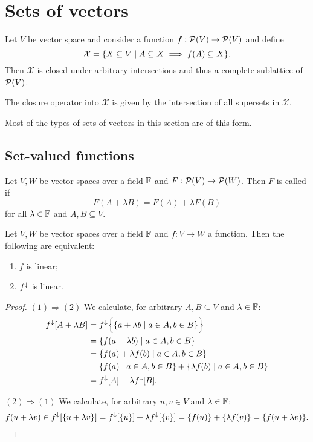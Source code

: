 \section{Sets of vectors}
\begin{proposition} \label{latticesOfVectorSubsets}
Let $V$ be vector space and consider a function $f: \operatorname{\mathcal{P}}(V) \to \operatorname{\mathcal{P}}(V)$ and define
\[ \mathcal{X} = \setbuilder{X\subseteq V}{A \subseteq X \implies f(A)\subseteq X}. \]
Then $\mathcal{X}$ is closed under arbitrary intersections and thus a complete sublattice of $\operatorname{\mathcal{P}}(V)$.

The closure operator into $\mathcal{X}$ is given by the intersection of all supersets in $\mathcal{X}$.
\end{proposition}

Most of the types of sets of vectors in this section are of this form.



\subsection{Set-valued functions}
\begin{definition}
Let $V,W$ be vector spaces over a field $\mathbb{F}$ and $F: \operatorname{\mathcal{P}}(V)\to \operatorname{\mathcal{P}}(W)$. Then $F$ is called  if
\[ F(A+\lambda B) = F(A) + \lambda F(B) \]
for all $\lambda \in \mathbb{F}$ and $A,B\subseteq V$.
\end{definition}

\begin{lemma} \label{linearImageFunction}
Let $V,W$ be vector spaces over a field $\mathbb{F}$ and $f: V\to W$ a function. Then the following are equivalent:
\begin{enumerate}
\item $f$ is linear;
\item $f^\downarrow$ is linear.
\end{enumerate}
\end{lemma}
\begin{proof}
$(1) \Rightarrow (2)$ We calculate, for arbitrary $A,B\subseteq V$ and $\lambda\in \mathbb{F}$:
\begin{align*}
f^\imf[A+\lambda B] &= f^\imf\Big\{\setbuilder{a+\lambda b}{a\in A, b\in B}\Big\} \\
&= \setbuilder{f(a+\lambda b)}{a\in A, b\in B} \\
&= \setbuilder{f(a)+\lambda f(b)}{a\in A, b\in B} \\
&= \setbuilder{f(a)}{a\in A, b\in B} + \setbuilder{\lambda f(b)}{a\in A, b\in B} \\
&= f^\imf[A]+ \lambda f^\imf[B].
\end{align*}

$(2) \Rightarrow (1)$ We calculate, for arbitrary $u,v\in V$ and $\lambda\in \mathbb{F}$:
\[ f(u+\lambda v) \in f^\downarrow[\{u+\lambda v\}] = f^\downarrow[\{u\}] + \lambda f^\downarrow[\{v\}] = \{f(u)\} +\{\lambda f(v)\} = \{f(u+\lambda v)\}. \]
\end{proof}

